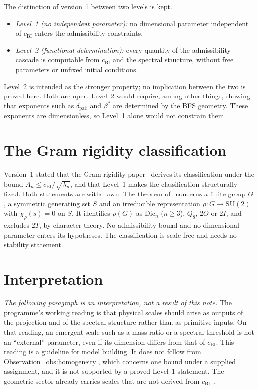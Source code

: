 \documentclass[11pt,a4paper]{article}
\begin{document}
    The distinction of version~1 between two levels is kept.
    \begin{itemize}
      \item \emph{Level~1 (no independent parameter):} no dimensional parameter independent of $c_{\mathrm{BI}}$
        enters the admissibility constraints.
      \item \emph{Level~2 (functional determination):} every quantity of the admissibility cascade is computable
        from $c_{\mathrm{BI}}$ and the spectral structure, without free parameters or unfixed initial
        conditions.
    \end{itemize}
    Level~2 is intended as the stronger property; no implication between the two is proved here.
    Both are open.
    Level~2 would require, among other things, showing that exponents such as $\delta_{\mathrm{pair}}$ and
    $\beta^*$ are determined by the BFS geometry.
    These exponents are dimensionless, so Level~1 alone would not constrain them.

  \section{The Gram rigidity classification}
  \label{sec:gram}

    Version~1 stated that the Gram rigidity paper~\cite{Beau2026a3} derives its classification under the bound
    $A_n\le c_{\mathrm{BI}}/\sqrt{\lambda_n}$, and that Level~1 makes the classification structurally fixed.
    Both statements are withdrawn.
    The theorem of~\cite{Beau2026a3} concerns a finite group $G$, a symmetric generating set $S$ and an
    irreducible representation $\rho\colon G\to\mathrm{SU}(2)$ with $\chi_\rho(s)=0$ on $S$.
    It identifies $\rho(G)$ as $\mathrm{Dic}_n$ ($n\ge 3$), $Q_8$, $2O$ or $2I$, and excludes $2T$, by character
    theory.
    No admissibility bound and no dimensional parameter enters its hypotheses.
    The classification is scale-free and needs no stability statement.

  \section{Interpretation}
  \label{sec:interpretation}

    \emph{The following paragraph is an interpretation, not a result of this note.}
    The programme's working reading is that physical scales should arise as outputs of the projection and of the
    spectral structure rather than as primitive inputs.
    On that reading, an emergent scale such as a mass ratio or a spectral threshold is not an ``external''
    parameter, even if its dimension differs from that of $c_{\mathrm{BI}}$.
    This reading is a guideline for model building.
    It does not follow from Observation~\ref{obs:homogeneity}, which concerns one bound under a supplied
    assignment, and it is not supported by a proved Level~1 statement.
    The geometric sector already carries scales that are not derived from $c_{\mathrm{BI}}$~\cite{Beau2026q6b}.
\end{document}
